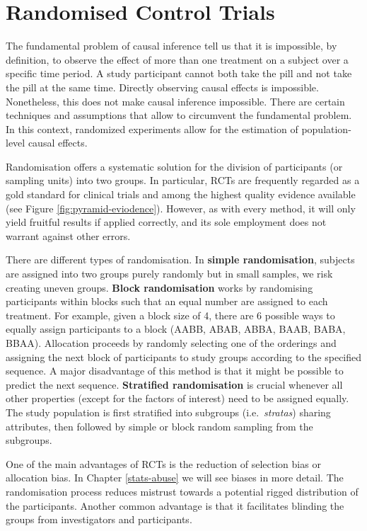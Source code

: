 \documentclass[
  12pt,
]{book}
\begin{document}
\section{Randomised Control Trials}\label{randomised-control-trials}

The fundamental problem of causal inference tell us that it is impossible, by definition, to observe the effect of more than one treatment on a subject over a specific time period. A study participant cannot both take the pill and not take the pill at the same time. Directly observing causal effects is impossible. Nonetheless, this does not make causal inference impossible. There are certain techniques and assumptions that allow to circumvent the fundamental problem. In this context, randomized experiments allow for the estimation of population-level causal effects.

Randomisation offers a systematic solution for the division of participants (or sampling units) into two groups. In particular, RCTs are frequently regarded as a gold standard for clinical trials and among the highest quality evidence available (see Figure \ref{fig:pyramid-eviodence}). However, as with every method, it will only yield fruitful results if applied correctly, and its sole employment does not warrant against other errors.

There are different types of randomisation. In \textbf{simple randomisation}, subjects are assigned into two groups purely randomly but in small samples, we risk creating uneven groups. \textbf{Block randomisation} works by randomising participants within blocks such that an equal number are assigned to each treatment. For example, given a block size of 4, there are 6 possible ways to equally assign participants to a block (AABB, ABAB, ABBA, BAAB, BABA, BBAA). Allocation proceeds by randomly selecting one of the orderings and assigning the next block of participants to study groups according to the specified sequence. A major disadvantage of this method is that it might be possible to predict the next sequence. \textbf{Stratified randomisation} is crucial whenever all other properties (except for the factors of interest) need to be assigned equally. The study population is first stratified into subgroups (i.e.~\emph{stratas}) sharing attributes, then followed by simple or block random sampling from the subgroups.

One of the main advantages of RCTs is the reduction of selection bias or allocation bias. In Chapter \ref{stats-abuse} we will see biases in more detail. The randomisation process reduces mistrust towards a potential rigged distribution of the participants. Another common advantage is that it facilitates blinding the groups from investigators and participants.
\end{document}
